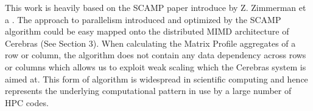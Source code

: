 This work is heavily based on the SCAMP paper introduce by Z. Zimmerman et a \cite{4}. The approach to parallelism introduced and optimized by the SCAMP algorithm could be easy mapped onto the distributed MIMD architecture of Cerebras (See Section 3). When calculating the Matrix Profile aggregates of a row or column, the algorithm does not contain any data dependency across rows or columns which allows us to exploit weak scaling which the Cerebras system is aimed at. This form of algorithm is widespread in scientific computing and hence represents the underlying computational pattern in use by a large number of HPC codes.
